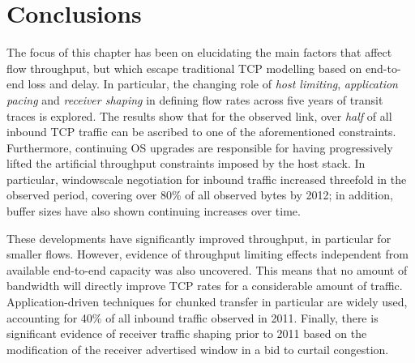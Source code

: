 \section{Conclusions}
\label{section:malawi:conclusion}

The focus of this chapter has been on elucidating the main factors that affect flow throughput, but which escape traditional \ac{TCP} modelling based on end-to-end loss and delay. 
In particular, the changing role of \emph{host limiting}, \emph{application pacing} and \emph{receiver shaping} in defining flow rates across five years of transit traces is explored.
The results show that for the observed link, over \emph{half} of all inbound \ac{TCP} traffic can be ascribed to one of the aforementioned constraints.
Furthermore, continuing OS upgrades are responsible for having progressively lifted the artificial throughput constraints imposed by the host stack. 
In particular, windowscale negotiation for inbound traffic increased threefold in the observed period, covering over 80\% of all observed bytes by 2012; in addition, buffer sizes have also shown continuing increases over time.

These developments have significantly improved throughput, in particular for smaller flows. However, evidence of throughput limiting effects independent from available end-to-end capacity was also uncovered. 
This means that no amount of bandwidth will directly improve \ac{TCP} rates for a considerable amount of traffic.
Application-driven techniques for chunked transfer in particular are widely used, accounting for 40\% of all inbound traffic observed in 2011.
Finally, there is significant evidence of receiver traffic shaping prior to 2011 based on the modification of the receiver advertised window in a bid to curtail congestion.



